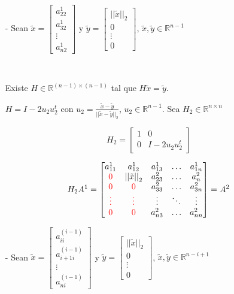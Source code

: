 \begin{itemize}
    \item[-] Sean $\tilde{x}=\begin{bmatrix}
        a_{22}^{1} \\ a_{32}^{1} \\ \vdots \\ a_{n2}^{1}
    \end{bmatrix}$ y $\tilde{y} = \begin{bmatrix}
        {||\tilde{x}||}_{2} \\ 0 \\ \vdots \\ 0
    \end{bmatrix}$,  $\tilde{x}, \tilde{y} \in \mathbb{R}^{n-1}$
    
    \
    
    \noindent Existe $H \in \mathbb{R}^{(n-1)\times(n-1)}$ tal que $H\tilde{x} = \tilde{y}$.
    
    \noindent $H = I - 2u_{2}u_{2}^{t}$ con $u_2 = \frac{\tilde{x} - \tilde{y}}{{||\tilde{x} - \tilde{y}||}_{2}}$, $u_2 \in \mathbb{R}^{n-1}$. Sea $H_2 \in \mathbb{R}^{n \times n}$
    
    \[H_2 = \begin{bmatrix}
        1 & 0 \\
        0 & I - 2u_{2}u_{2}^{t}
    \end{bmatrix}\]

    \[H_{2}A^{1} = \begin{bmatrix}
        a_{11}^{1} & a_{12}^{1} & a_{13}^{1} & \ldots & a_{1n}^{1} \\
        \textcolor{red}{0} & {||\tilde{x}||}_{2} & a_{23}^{2} & \ldots & a_{n}^{2} \\
        \textcolor{red}{0} & \textcolor{red}{0} & a_{33}^{2} & \ldots & a_{3n}^{2} \\
        \textcolor{red}{\vdots} & \textcolor{red}{\vdots} & \vdots & \ddots & \vdots \\
        \textcolor{red}{0} & \textcolor{red}{0} & a_{n3}^{2} & \ldots & a_{nn}^{2} \\
    \end{bmatrix} = A^{2}\]
    
    \item[-] Sean $\tilde{x}=\begin{bmatrix}
        a_{ii}^{(i-1)} \\ a_{i+1i}^{(i-1)} \\ \vdots \\ a_{ni}^{(i-1)}
    \end{bmatrix}$ y $\tilde{y} = \begin{bmatrix}
        {||\tilde{x}||}_{2} \\ 0 \\ \vdots \\ 0
    \end{bmatrix}$,  $\tilde{x}, \tilde{y} \in \mathbb{R}^{n-i+1}$
    

\end{itemize}
